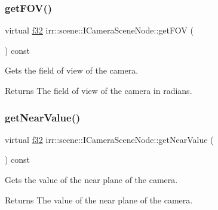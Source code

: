 \subsubsection{\texorpdfstring{get\+F\+O\+V()}{getFOV()}\hspace{0.1cm}{\footnotesize\ttfamily [2/2]}}
{\footnotesize\ttfamily virtual \hyperlink{namespaceirr_a0277be98d67dc26ff93b1a6a1d086b07}{f32} irr\+::scene\+::\+I\+Camera\+Scene\+Node\+::get\+F\+OV (\begin{DoxyParamCaption}{ }\end{DoxyParamCaption}) const\hspace{0.3cm}{\ttfamily [pure virtual]}}



Gets the field of view of the camera. 

\begin{DoxyReturn}{Returns}
The field of view of the camera in radians. 
\end{DoxyReturn}
\mbox{\label{classirr_1_1scene_1_1ICameraSceneNode_aee5dfccee2ec0b0cbcdb1079a6430a25}} 
\subsubsection{\texorpdfstring{get\+Near\+Value()}{getNearValue()}\hspace{0.1cm}{\footnotesize\ttfamily [1/2]}}
{\footnotesize\ttfamily virtual \hyperlink{namespaceirr_a0277be98d67dc26ff93b1a6a1d086b07}{f32} irr\+::scene\+::\+I\+Camera\+Scene\+Node\+::get\+Near\+Value (\begin{DoxyParamCaption}{ }\end{DoxyParamCaption}) const\hspace{0.3cm}{\ttfamily [pure virtual]}}



Gets the value of the near plane of the camera. 

\begin{DoxyReturn}{Returns}
The value of the near plane of the camera. 
\end{DoxyReturn}
\mbox{\label{classirr_1_1scene_1_1ICameraSceneNode_aee5dfccee2ec0b0cbcdb1079a6430a25}} 
